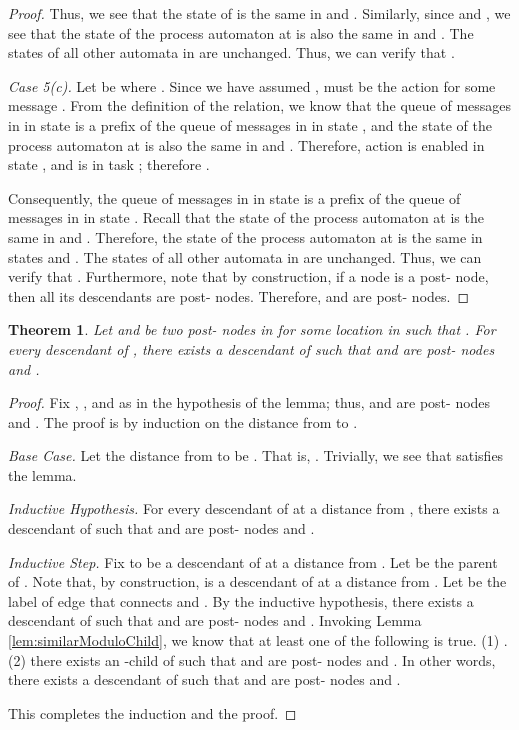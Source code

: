 \documentclass[11pt]{article}
\newtheorem{theorem}{Theorem}
\numberwithin{theorem}{section}
\begin{document}
\begin{proof}
 Thus, we see that the state of  is the same in  and . Similarly, since  and , we see that the state of the process automaton at  is also the same in  and . The states of all other automata in  are unchanged.
 Thus, we can verify that .
 
 \emph{Case 5(c).} Let  be  where . 
 Since we have assumed ,  must be the action  for some message . From the definition of the  relation, we know that the queue of messages in  in state  is a prefix of the queue of messages in  in state , and the state of the process automaton at  is also the same in  and . Therefore, action  is enabled in state  , and  is in task ; therefore .
 
 Consequently, the queue of messages in  in state  is a prefix of the queue of messages in  in state . 
 Recall that the state of the process automaton at  is the same in  and . 
 Therefore, the state of the process automaton at  is the same in states  and . The states of all other automata in  are unchanged.
 Thus, we can verify that . Furthermore, note that by construction, if a node  is a post- node, then all its descendants are post- nodes. Therefore,  and  are post- nodes.
 \end{proof}


\begin{theorem}\label{thm:similarModuloDescendant}
 Let  and  be two post- nodes in  for some location  in  such that . For every descendant  of , there exists a descendant  of  such that  and  are post- nodes and .
\end{theorem}
\begin{proof}
 Fix , , and  as in the hypothesis of the lemma; thus,  and  are post- nodes and . The proof is by induction on the distance from  to .
 
 \emph{Base Case.} 
 Let the distance from  to  be . That is, . Trivially, we see that  satisfies the lemma.
 
 \emph{Inductive Hypothesis.} 
 For every descendant  of  at a distance  from , there exists a descendant  of  such that  and  are post- nodes and .
 
 \emph{Inductive Step.}
 Fix  to be a descendant of  at a distance  from . Let  be the parent of . Note that, by construction,  is a descendant of  at a distance  from . Let  be the label of edge  that connects  and .
 By the inductive hypothesis, there exists a descendant  of  such that  and  are post- nodes and .
  Invoking Lemma \ref{lem:similarModuloChild}, we know that at least one of the following is true. (1) . (2) there exists an -child  of  such that  and  are post- nodes and . In other words, there exists a descendant  of  such that   and  are post- nodes and .
 
 This completes the induction and the proof.
\end{proof}
\end{document}
